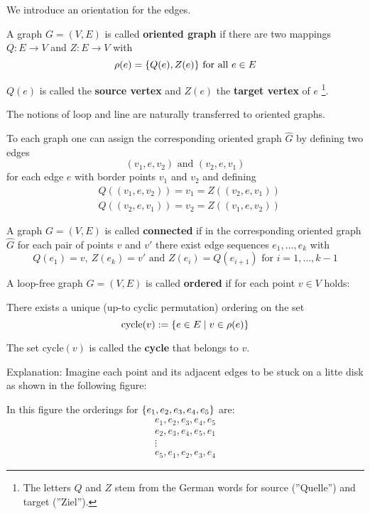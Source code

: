 We introduce an orientation for the edges. 

\begin{definition}
A graph $G = (V,E)$ is called {\bf oriented graph} if there are two mappings
$Q : E \to V$ and $Z : E \to V$ with
\[ \rho(e) = \mbox{$\{Q(e), Z(e)\}$}\text{ for all }e \in E \]
\end{definition}

$Q(e)$ is called the {\bf source vertex} and $Z(e)$ the {\bf target vertex} of
$e$ \footnote{The letters $Q$ and $Z$ stem from the German words for source
(''Quelle'') and target (''Ziel'').}.

The notions of loop and line are naturally transferred to oriented graphs.

To each graph one can assign the corresponding oriented graph $\hat{G}$ by
defining two edges
\[ (v_1, e, v_2)\text{ and }(v_2,e,v_1) \]
for each edge $e$ with border points $v_1$ and $v_2$ and defining
\begin{eqnarray*}
& Q((v_1, e, v_2)) = v_1 = Z((v_2, e, v_1)) \\
& Q((v_2, e, v_1)) = v_2 = Z((v_1, e, v_2))
\end{eqnarray*}

\bigskip
\begin{definition}
A graph $G = (V,E)$ is called {\bf connected} if in the corresponding oriented
graph $\hat{G}$ for each pair of points $v$ and $v'$ there exist edge sequences
$e_1, \ldots, e_k$ with
\[ Q(e_1) = v,\ Z(e_k) = v'\text{ and }Z(e_i) = Q(e_{i+1})\text{ for }i = 1,
\ldots, k-1 \]
\end{definition}

\bigskip
\begin{definition}
A loop-free graph $G = (V,E)$ is called {\bf ordered} if for each point $v \in
V$ holds:

There exists a unique (up-to cyclic permutation) ordering on the set
\[ \mathrm{cycle}(v) := \mbox{$\{e \in E \mid v \in \rho(e)\}$} \]
\end{definition}

The set $\mathrm{cycle}(v)$ is called the {\bf cycle} that belongs to $v$.

Explanation: Imagine each point and its adjacent edges to be stuck on a litte
disk as shown in the following figure:

\begin{center}

\end{center}

In this figure the orderings for $\mbox{$\{e_1, e_2, e_3, e_4, e_5\}$}$ are:
\begin{eqnarray*}
& e_1, e_2, e_3, e_4, e_5 \\
& e_2, e_3, e_4, e_5, e_1 \\
& \vdots & \\
& e_5, e_1, e_2, e_3, e_4
\end{eqnarray*}

